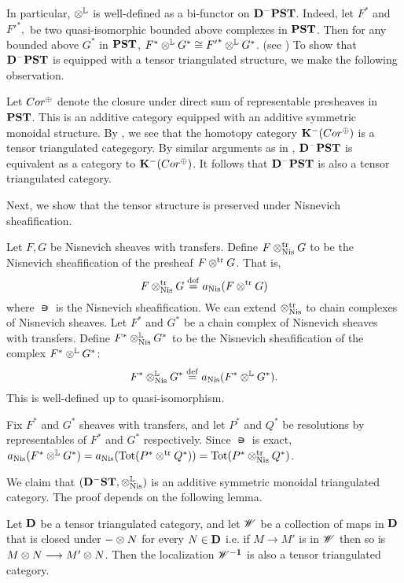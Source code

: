In particular, $\tL$ is well-defined as a bi-functor on 
$\DCat[D]^-\PST$. Indeed, let $F^*$ and ${F'}^*,$ be two 
quasi-isomorphic bounded above complexes in $\PST$. Then for any 
bounded above $G^*$ in $\PST$, $F^* \tL G^* \cong {F'}^* \tL G^*$. 
(see \cite[Lemma 8.7]{MVW}) To show that $\DCat^-\PST$ is equipped
with a tensor triangulated structure, we make the following 
observation.

Let $\Cor^{\oplus}$ denote the closure under direct 
sum of representable presheaves in $\PST$. This is an additive
category equipped with an additive symmetric monoidal structure.
By \cite[Prop. 8A.4]{MVW}, we see that the homotopy category 
$\DCat[K]^-(\Cor^{\oplus})$ is a tensor triangulated categegory.
By similar arguments as in \cite[10.4.8]{WH}, $\DCat[D]^-\PST$
is equivalent as a category to $\DCat[K]^-(\Cor^{\oplus})$.
It follows that $\DCat[D]^-\PST$ is also a tensor triangulated 
category.

Next, we show that the tensor structure is preserved under
Nisnevich sheafification.

\begin{defn}\label{def_shcor_tensor}
Let $F, G$ be Nisnevich sheaves with transfers. Define
$F \ttrNis G$ to be the Nisnevich sheafification of the presheaf
$F \ttr G$. That is,
\[
F \ttrNis G \defeq \nis(F \ttr G)
\]
where $\nis$ is the Nisnevich sheafification. We can extend 
$\ttrNis$ to chain complexes of Nisnevich sheaves. Let $F^*$ and 
$G^*$ be a chain complex of Nisnevich sheaves with transfers. 
Define $F^* \tLNis G^*$ to be the Nisnevich sheafification of the 
complex $F^* \tL G^*$:
\[
F^* \tLNis G^* \defeq \nis(F^* \tL G^*).
\]
This is well-defined up to quasi-isomorphism.
\end{defn}

\begin{rmk}
Fix $F^*$ and $G^*$ sheaves with transfers, and let $P^*$ and 
$Q^*$ be resolutions by representables of $F^*$ and $G^*$ 
respectively. Since $\nis$ is exact, $\nis(F^* \tL G^*) = 
\nis(\Tot(P^* \ttr Q^*)) = \Tot(P^* \ttrNis Q^*)$.
\end{rmk}

We claim that $(\DShCor, \tLNis)$ is an additive symmetric 
monoidal triangulated category. The proof depends on the following
lemma.

\begin{lem}\label{lem_loc_and_tensor}
Let $\DCat$ be a tensor triangulated category, and let $\Cat{W}$
be a collection of maps in $\DCat$ that is closed under $-\tensor 
N$ for every $N \in \DCat$ i.e. if $M \to M'$ is in $\Cat{W}$ then 
so is $M \tensor N \to M' \tensor N$. Then the localization $\DCat 
[\Cat{W}^{-1}]$ is also a tensor triangulated category.
\end{lem}

